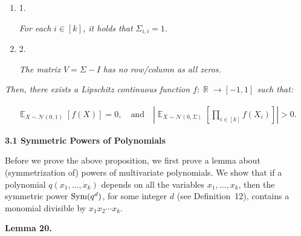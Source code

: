 \begin{enumerate}


\item[] 
1. 


\emph{For each }$i\in[k]$\emph{, it holds that }$\Sigma_{i,i}=1$\emph{.}\par





\item[] 
2. 


\emph{The matrix }$V=\Sigma-I$\emph{ has no row/column as all zeros.}\par





\end{enumerate}




\emph{Then, there exists a Lipschitz continuous function $f:\mathop{\mathbb{R}}\to[-1,1]$ such that:}\par


\[\begin{gathered}
\mathop{\mathbb{E}}_{X\sim\mathcal{N}(0,1)}\left[f(X)\right]=0,\quad\text{and}\quad\left|\mathop{\mathbb{E}}_{X\sim\mathcal{N}(0,\Sigma)}\left[\prod_{i\in[k]}f(X_{i})\right]\right|>0.
\end{gathered}\]






\par\medskip\noindent\textbf{
3.1 Symmetric Powers of Polynomials}\par




Before we prove the above proposition, we first prove a lemma about (symmetrization of) powers of multivariate polynomials.
We show that if a polynomial $q(x_{1},\dots,x_{k})$ depends on all the variables $x_{1},\dots,x_{k}$, then the symmetric power $\textnormal{Sym}(q^{d})$, for some integer $d$ (see Definition 12), contains a monomial divisible by $x_{1}x_{2}\cdots x_{k}$.\par





\par\medskip\noindent\textbf{
\textbf{Lemma 20}\textbf{.}
}\par



